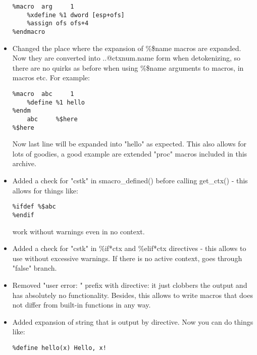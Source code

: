 \begin{itemize}
{\begin{lstlisting}
%macro  arg     1
    %xdefine %1 dword [esp+ofs]
    %assign ofs ofs+4
%endmacro
\end{lstlisting}}
    \item{Changed the place where the expansion of \%\$name macros are expanded.
        Now they are converted into ..@ctxnum.name form when detokenizing, so
        there are no quirks as before when using \%\$name arguments to macros,
        in macros etc. For example:
\begin{lstlisting}
%macro  abc     1
    %define %1 hello
%endm
    abc     %$here
%$here
\end{lstlisting}
        Now last line will be expanded into "hello" as expected. This also allows
        for lots of goodies, a good example are extended "proc" macros included
        in this archive.}

    \item{Added a check for "cstk" in smacro\_defined() before calling get\_ctx() -
        this allows for things like:
\begin{lstlisting}
%ifdef %$abc
%endif
\end{lstlisting}
        work without warnings even in no context.}
    \item{Added a check for "cstk" in \%if*ctx and \%elif*ctx directives -
        this allows to use  without excessive warnings. If there is
        no active context,  goes through "false" branch.}
    \item{Removed "user error: " prefix with  directive: it just clobbers the
        output and has absolutely no functionality. Besides, this allows to write
        macros that does not differ from built-in functions in any way.}
    \item{Added expansion of string that is output by  directive. Now you
        can do things like:
\begin{lstlisting}
%define hello(x) Hello, x!


\end{lstlisting}}
\end{itemize}
